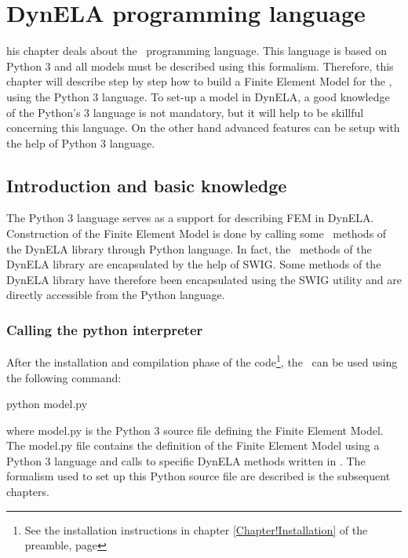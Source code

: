 %
%
%
\chapter{DynELA programming language}

\startcontents[chapters]
\printmyminitoc[1]his chapter deals about the \DynELA~programming language. This language is based on Python 3 and all models must be described using this formalism. Therefore, this chapter will describe step by step how to build a Finite Element Model for the \DynELA, using the Python 3 language. To set-up a model in DynELA, a good knowledge of the Python's 3 language is not mandatory, but it will help to be skillful concerning this language. On the other hand advanced features can be setup with the help of Python 3 language.

\section{Introduction and basic knowledge}
The Python 3 language serves as a support for describing FEM in DynELA. Construction of the Finite Element Model is done by calling some \Cpp~methods of the DynELA library through Python language. In fact, the \Cpp~methods of the DynELA library are encapsulated by the help of SWIG. Some methods of the DynELA library have therefore been encapsulated using the SWIG utility and are directly accessible from the Python language.

\subsection{Calling the python interpreter}

After the installation and compilation phase of the code\footnote{See the installation instructions in chapter \ref{Chapter!Installation} of the preamble, page \pageref{Chapter!Installation}}, the \DynELA~can be used using the following command:

\begin{BashListing}
python model.py
\end{BashListing}

where \textsf{model.py} is the Python 3 source file defining the Finite Element Model. The \textsf{model.py} file contains the definition of the Finite Element Model using a Python 3 language and calls to specific DynELA methods written in \Cpp. The formalism used to set up this Python source file are described is the subsequent chapters.

